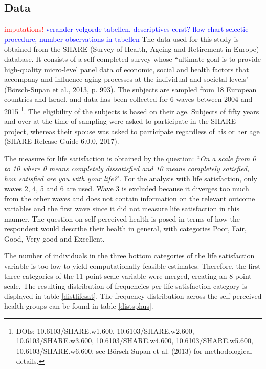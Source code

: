 \documentclass[12pt]{article}
\begin{document}
\subsection{Data} \textcolor{red}{imputations!} \textcolor{blue}{verander volgorde tabellen, descriptives eerst? flow-chart selectie procedure, number observations in tabellen}
The data used for this study is obtained from the SHARE (Survey of Health, Ageing and Retirement in Europe) database. It consists of a self-completed survey whose ``ultimate goal is to provide high-quality micro-level panel data of economic, social and health factors that accompany and influence aging processes at the individual and societal levels" (Börsch-Supan et al., 2013, p. 993). The subjects are sampled from 18 European countries and Israel, and data has been collected for 6 waves between 2004 and 2015 \footnote{DOIs: 10.6103/SHARE.w1.600, 10.6103/SHARE.w2.600, 10.6103/SHARE.w3.600, 10.6103/SHARE.w4.600, 10.6103/SHARE.w5.600, 10.6103/SHARE.w6.600, see Börsch-Supan et al. (2013) for methodological details.}. The eligibility of the subjects is based on their age. Subjects of fifty years and over at the time of sampling were asked to participate in the SHARE project, whereas their spouse was asked to participate regardless of his or her age (SHARE Release Guide 6.0.0, 2017). 

The measure for life satisfaction is obtained by the question: ``{\textit{On a scale from 0 to 10 where 0 means completely dissatisfied and 10 means completely satisfied, how satisfied are you with your life?}}". For the analysis with life satisfaction, only waves 2, 4, 5 and 6 are used. Wave 3 is excluded because it diverges too much from the other waves and does not contain information on the relevant outcome variables and the first wave since it did not measure life satisfaction in this manner. The question on self-perceived health is posed in terms of how the respondent would describe their health in general, with categories Poor, Fair, Good, Very good and Excellent.  

The number of individuals in the three bottom categories of the life satisfaction variable is too low to yield computationally feasible estimates. Therefore, the first three categories of the 11-point scale variable were merged, creating an 8-point scale. The resulting distribution of frequencies per life satisfaction category is displayed in table \ref{distlifesat}. The frequency distribution across the self-perceived health groups can be found in table \ref{distsphus}.
\end{document}
